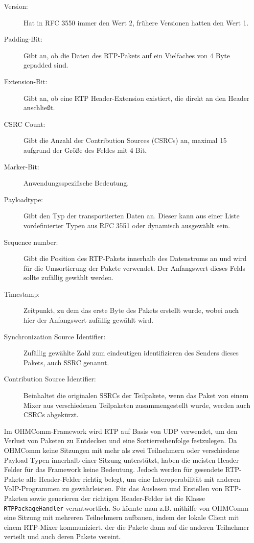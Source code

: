 \begin{description}
\item[Version:] Hat in RFC 3550 immer den Wert 2, frühere Versionen hatten den Wert 1.
\item[Padding-Bit:] Gibt an, ob die Daten des RTP-Pakets auf ein Vielfaches von 4 Byte gepadded sind.
\item[Extension-Bit:] Gibt an, ob eine RTP Header-Extension existiert, die direkt an den Header anschließt.
\item[CSRC Count:] Gibt die Anzahl der Contribution Sources (CSRCs) an, maximal 15 aufgrund der Größe des Feldes mit 4 Bit.
\item[Marker-Bit:] Anwendungsspezifische Bedeutung.
\item[Payloadtype:] Gibt den Typ der transportierten Daten an. Dieser kann aus einer Liste vordefinierter Typen aus RFC 3551 oder dynamisch ausgewählt sein.
\item[Sequence number:] Gibt die Position des RTP-Pakets innerhalb des Datenstroms an und wird für die Umsortierung der Pakete verwendet. Der Anfangswert dieses Felds sollte zufällig gewählt werden.
\item[Timestamp:] Zeitpunkt, zu dem das erste Byte des Pakets erstellt wurde, wobei auch hier der Anfangswert zufällig gewählt wird.
\item[Synchronization Source Identifier:] Zufällig gewählte Zahl zum eindeutigen identifizieren des Senders dieses Pakets, auch SSRC genannt.
\item[Contribution Source Identifier:] Beinhaltet die originalen SSRCs der Teilpakete, wenn das Paket von einem Mixer aus verschiedenen Teilpaketen zusammengestellt wurde, werden auch CSRCs abgekürzt.
\end{description}
Im OHMComm-Framework wird RTP auf Basis von UDP verwendet, um den Verlust von Paketen zu Entdecken und eine Sortierreihenfolge festzulegen. Da OHMComm keine Sitzungen mit mehr als zwei Teilnehmern oder verschiedene Payload-Typen innerhalb einer Sitzung unterstützt, haben die meisten Header-Felder für das Framework keine Bedeutung. Jedoch werden für gesendete RTP-Pakete alle Header-Felder richtig belegt, um eine Interoperabilität mit anderen VoIP-Programmen zu gewährleisten. Für das Auslesen und Erstellen von RTP-Paketen sowie generieren der richtigen Header-Felder ist die Klasse \texttt{RTPPackageHandler} verantwortlich. So könnte man z.B. mithilfe von OHMComm eine  Sitzung mit mehreren Teilnehmern aufbauen, indem der lokale Client mit einem RTP-Mixer kommuniziert, der die Pakete dann auf die anderen Teilnehmer verteilt und auch deren Pakete vereint.
